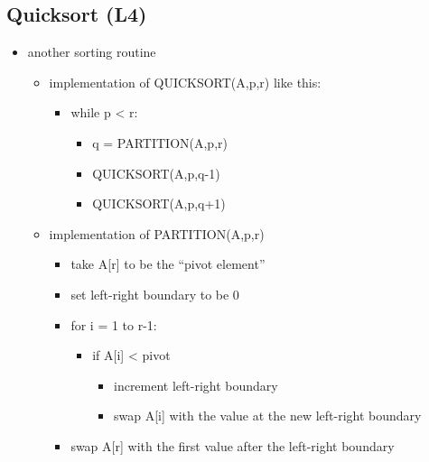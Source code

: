 \documentclass[
]{article}
\providecommand{\tightlist}{%
  \setlength{\itemsep}{0pt}\setlength{\parskip}{0pt}}
\begin{document}
\hypertarget{quicksort-l4}{%
\subsection{Quicksort (L4)}\label{quicksort-l4}}

\begin{itemize}
\tightlist
\item
  another sorting routine

  \begin{itemize}
  \tightlist
  \item
    implementation of QUICKSORT(A,p,r) like this:

    \begin{itemize}
    \tightlist
    \item
      while p \textless{} r:

      \begin{itemize}
      \tightlist
      \item
        q = PARTITION(A,p,r)
      \item
        QUICKSORT(A,p,q-1)
      \item
        QUICKSORT(A,p,q+1)
      \end{itemize}
    \end{itemize}
  \item
    implementation of PARTITION(A,p,r)

    \begin{itemize}
    \tightlist
    \item
      take A{[}r{]} to be the ``pivot element''
    \item
      set left-right boundary to be 0
    \item
      for i = 1 to r-1:

      \begin{itemize}
      \tightlist
      \item
        if A{[}i{]} \textless{} pivot

        \begin{itemize}
        \tightlist
        \item
          increment left-right boundary
        \item
          swap A{[}i{]} with the value at the new left-right boundary
        \end{itemize}
      \end{itemize}
    \item
      swap A{[}r{]} with the first value after the left-right boundary
    \end{itemize}
  \end{itemize}
\end{itemize}
\end{document}
